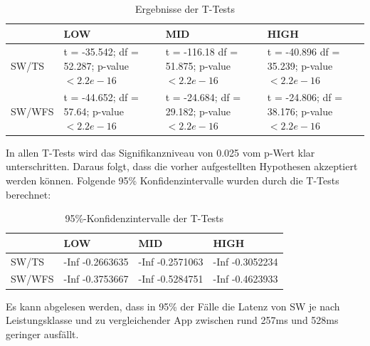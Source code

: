 \begin{table}[h]

\begin{tabular}{l|p{2cm}|p{2cm}|p{2cm}}
& LOW & MID & HIGH \\
\hline
SW/TS & t = -35.542; \newline df = 52.287; \newline p-value $< 2.2e-16$ & t = -116.18 \newline df = 51.875; \newline p-value $< 2.2e-16$ & t = -40.896 \newline df = 35.239; \newline p-value $< 2.2e-16$\\
\hline
SW/WFS & t = -44.652; \newline df = 57.64; \newline p-value $< 2.2e-16$ & t = -24.684; \newline df = 29.182; \newline p-value $< 2.2e-16$ & t = -24.806; \newline df = 38.176; \newline p-value $< 2.2e-16$ \\

\end{tabular}
\caption{Ergebnisse der T-Tests}
\end{table}

In allen T-Tests wird das Signifikanzniveau von 0.025 vom p-Wert klar unterschritten. Daraus folgt, dass die vorher aufgestellten Hypothesen akzeptiert werden können. Folgende 95\% Konfidenzintervalle wurden durch die T-Tests berechnet:

\begin{table}[h]

\begin{tabular}{l|p{2cm}|p{2cm}|p{2cm}}
& LOW & MID & HIGH \\
\hline
SW/TS & -Inf -0.2663635 & -Inf -0.2571063 & -Inf -0.3052234 \\
\hline
SW/WFS & -Inf -0.3753667 & -Inf -0.5284751 & -Inf -0.4623933 \\

\end{tabular}
\caption{95\%-Konfidenzintervalle der T-Tests}
\end{table}

Es kann abgelesen werden, dass in 95\% der Fälle die Latenz von SW je nach Leistungsklasse und zu vergleichender App zwischen rund 257ms und 528ms geringer ausfällt.